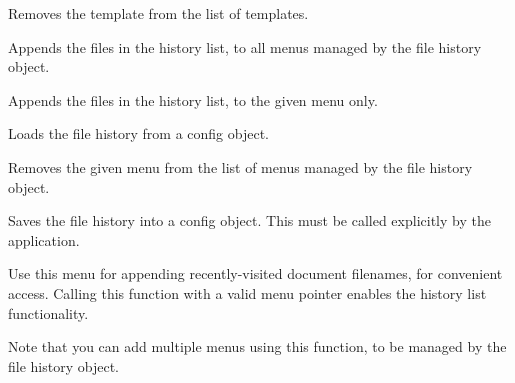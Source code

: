 Removes the template from the list of templates.

\label{wxdocmanagerfilehistoryaddfilestomenu}


Appends the files in the history list, to all menus managed by the file history object.


Appends the files in the history list, to the given menu only.

\label{wxdocmanagerfilehistoryload}


Loads the file history from a config object.



\label{wxdocmanagerfilehistoryremovemenu}


Removes the given menu from the list of menus managed by the file history object.

\label{wxdocmanagerfilehistorysave}


Saves the file history into a config object. This must be called
explicitly by the application.



\label{wxdocmanagerfilehistoryusemenu}


Use this menu for appending recently-visited document filenames, for convenient
access. Calling this function with a valid menu pointer enables the history
list functionality.

Note that you can add multiple menus using this function, to be managed by the
file history object.


